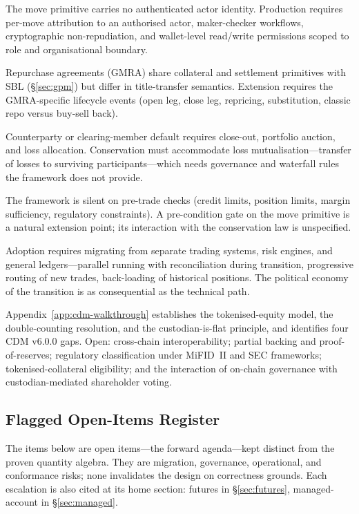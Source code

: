 \documentclass[11pt,a4paper]{article}
\begin{document}
\begin{description}[nosep]
\item[Access control and actor attribution.] The move primitive carries no authenticated actor identity. Production requires per-move attribution to an authorised actor, maker-checker workflows, cryptographic non-repudiation, and wallet-level read/write permissions scoped to role and organisational boundary.
\item[Repos.] Repurchase agreements (GMRA) share collateral and settlement primitives with SBL (\S\ref{sec:gpm}) but differ in title-transfer semantics. Extension requires the GMRA-specific lifecycle events (open leg, close leg, repricing, substitution, classic repo versus buy-sell back).
\item[Default management.] Counterparty or clearing-member default requires close-out, portfolio auction, and loss allocation. Conservation must accommodate loss mutualisation---transfer of losses to surviving participants---which needs governance and waterfall rules the framework does not provide.
\item[Pre-trade validation.] The framework is silent on pre-trade checks (credit limits, position limits, margin sufficiency, regulatory constraints). A pre-condition gate on the move primitive is a natural extension point; its interaction with the conservation law is unspecified.
\item[Migration from legacy architectures.] Adoption requires migrating from separate trading systems, risk engines, and general ledgers---parallel running with reconciliation during transition, progressive routing of new trades, back-loading of historical positions. The political economy of the transition is as consequential as the technical path.
\item[Tokenised securities.] Appendix~\ref{app:cdm-walkthrough} establishes the tokenised-equity model, the double-counting resolution, and the custodian-is-flat principle, and identifies four CDM v6.0.0 gaps. Open: cross-chain interoperability; partial backing and proof-of-reserves; regulatory classification under MiFID~II and SEC frameworks; tokenised-collateral eligibility; and the interaction of on-chain governance with custodian-mediated shareholder voting.
\end{description}

\subsection{Flagged Open-Items Register}

The items below are open items---the forward agenda---kept distinct from the proven quantity algebra. They are migration, governance, operational, and conformance risks; none invalidates the design on correctness grounds. Each escalation is also cited at its home section: futures in \S\ref{sec:futures}, managed-account in \S\ref{sec:managed}.
\end{document}
